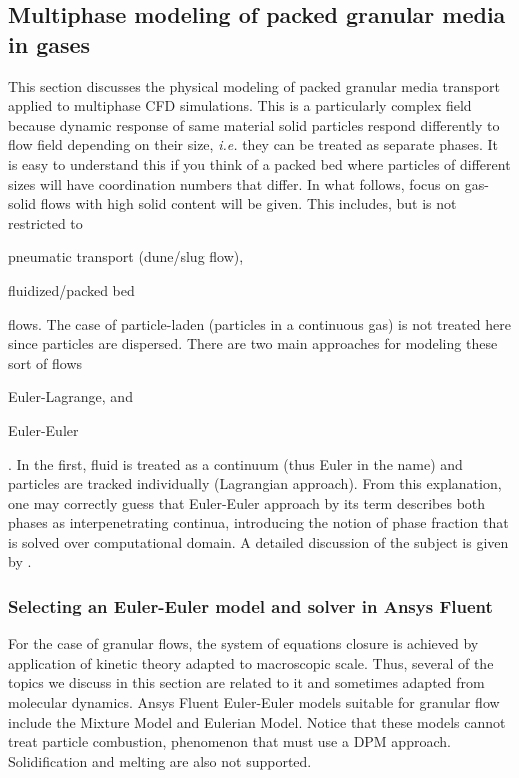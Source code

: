\subsection{Multiphase modeling of packed granular media in gases}

This section discusses the physical modeling of packed granular media transport applied to multiphase CFD simulations. This is a particularly complex field because dynamic response of same material solid particles respond differently to flow field depending on their size, \emph{i.e.} they can be treated as separate phases. It is easy to understand this if you think of a packed bed where particles of different sizes will have coordination numbers that differ. In what follows, focus on gas-solid flows with high solid content will be given. This includes, but is not restricted to \begin{inparaenum}[(i)] \item pneumatic transport (dune/slug flow), \item fluidized/packed bed \end{inparaenum} flows. The case of particle-laden (particles in a continuous gas) is not treated here since particles are dispersed. There are two main approaches for modeling these sort of flows \begin{inparaenum}[(i)] \item Euler-Lagrange, and \item Euler-Euler\end{inparaenum}. In the first, fluid is treated as a continuum (thus Euler in the name) and particles are tracked individually (Lagrangian approach). From this explanation, one may correctly guess that Euler-Euler approach by its term describes both phases as interpenetrating continua, introducing the notion of phase fraction that is solved over computational domain. A detailed discussion of the subject is given by \textcite{Crowe2011}.

\subsubsection{Selecting an Euler-Euler model and solver in Ansys Fluent}

For the case of granular flows, the system of equations closure is achieved by application of kinetic theory adapted to macroscopic scale. Thus, several of the topics we discuss in this section are related to it and sometimes adapted from molecular dynamics. Ansys Fluent Euler-Euler models suitable for granular flow include the Mixture Model and Eulerian Model. Notice that these models cannot treat particle combustion, phenomenon that must use a DPM approach. Solidification and melting are also not supported.

